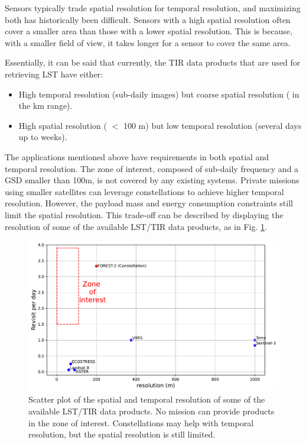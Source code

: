         Sensors typically trade spatial resolution for temporal resolution, and maximizing both has historically been difficult.
        Sensors with a high spatial resolution often cover a smaller area than those with a lower spatial resolution.
        This is because, with a smaller field of view, it takes longer for a sensor to cover the same area. 

        Essentially, it can be said that currently, the TIR data products that are used for retrieving LST have either: 
        
        \begin{itemize}
            \item High temporal resolution (sub-daily images) but coarse spatial resolution ( in the km range).
            \item High spatial resolution ( $<$ 100 m) but low temporal resolution (several days up to weeks).
        \end{itemize}

        The applications mentioned above have requirements in both spatial and temporal resolution. 
        The zone of interest, composed of sub-daily frequency and a GSD smaller than 100m, is not covered by any existing systems.
        Private missions using smaller satellites can leverage constellations to achieve higher temporal resolution.
        However, the payload mass and energy consumption constraints still limit the spatial resolution.
        This trade-off can be described by displaying the resolution of some of the available LST/TIR data products, as in Fig. \ref{fig:1-spatio-temporal-trade-off}. 

        \begin{figure}[H]
            \centering
            \includegraphics[width=\textwidth]{Includes/2-scatterplot-res-revisit.pdf}
            \caption{Scatter plot of the spatial and temporal resolution of some of the available LST/TIR data products. No mission can provide products in the zone of interest. Constellations may help with temporal resolution, but the spatial resolution is still limited.}
            \label{fig:1-spatio-temporal-trade-off}
        \end{figure}

